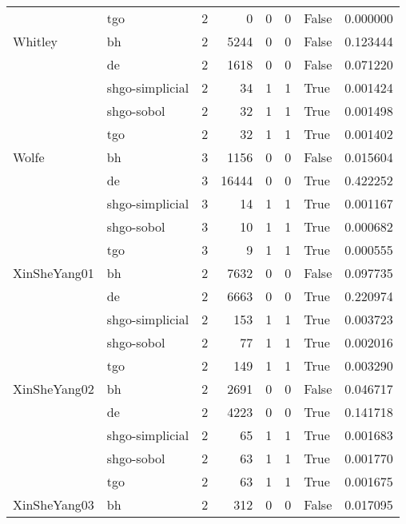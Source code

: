 \begin{longtable}{llrrrrlr}
         & tgo &     2 &        0 &      0 &       0 &   False &    0.000000 \\
Whitley & bh &     2 &     5244 &      0 &       0 &   False &    0.123444 \\
         & de &     2 &     1618 &      0 &       0 &   False &    0.071220 \\
         & shgo-simplicial &     2 &       34 &      1 &       1 &    True &    0.001424 \\
         & shgo-sobol &     2 &       32 &      1 &       1 &    True &    0.001498 \\
         & tgo &     2 &       32 &      1 &       1 &    True &    0.001402 \\
Wolfe & bh &     3 &     1156 &      0 &       0 &   False &    0.015604 \\
         & de &     3 &    16444 &      0 &       0 &    True &    0.422252 \\
         & shgo-simplicial &     3 &       14 &      1 &       1 &    True &    0.001167 \\
         & shgo-sobol &     3 &       10 &      1 &       1 &    True &    0.000682 \\
         & tgo &     3 &        9 &      1 &       1 &    True &    0.000555 \\
XinSheYang01 & bh &     2 &     7632 &      0 &       0 &   False &    0.097735 \\
         & de &     2 &     6663 &      0 &       0 &    True &    0.220974 \\
         & shgo-simplicial &     2 &      153 &      1 &       1 &    True &    0.003723 \\
         & shgo-sobol &     2 &       77 &      1 &       1 &    True &    0.002016 \\
         & tgo &     2 &      149 &      1 &       1 &    True &    0.003290 \\
XinSheYang02 & bh &     2 &     2691 &      0 &       0 &   False &    0.046717 \\
         & de &     2 &     4223 &      0 &       0 &    True &    0.141718 \\
         & shgo-simplicial &     2 &       65 &      1 &       1 &    True &    0.001683 \\
         & shgo-sobol &     2 &       63 &      1 &       1 &    True &    0.001770 \\
         & tgo &     2 &       63 &      1 &       1 &    True &    0.001675 \\
XinSheYang03 & bh &     2 &      312 &      0 &       0 &   False &    0.017095 \\

\end{longtable}
